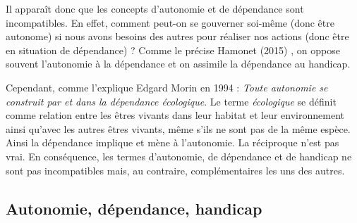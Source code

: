 Il apparaît donc que les concepts d'autonomie et de dépendance sont incompatibles. En effet, comment peut-on se gouverner soi-même (donc être autonome) si nous avons besoins des autres pour réaliser nos actions (donc être en situation de dépendance) ? Comme le précise Hamonet (2015) \cite{Hamonet2015}, on oppose souvent l'autonomie à la dépendance et on assimile la dépendance au handicap. 

Cependant, comme l'explique Edgard Morin en 1994 \cite{Morin1994} : \og \textit{Toute autonomie se construit par et dans la dépendance écologique}\fg{}. Le terme  \og \textit{écologique}\fg{} se définit comme relation entre les êtres vivants dans leur habitat et leur environnement ainsi qu'avec les autres êtres vivants, même s'ils ne sont pas de la même espèce. Ainsi la dépendance implique et mène à l'autonomie. La réciproque n'est pas vrai. En conséquence, les termes d'autonomie, de dépendance et de handicap ne sont pas incompatibles mais, au contraire, complémentaires les uns des autres.

\subsection{Autonomie, dépendance, handicap}


